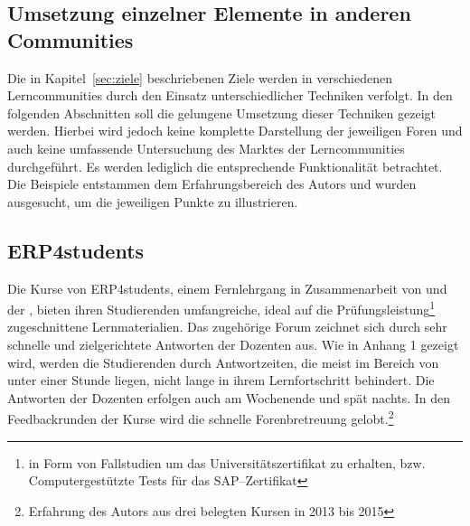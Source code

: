 \subsection{Umsetzung einzelner Elemente in anderen\\ Communities} %
\label{sub:umsetzung_einzelner_elemente_in_anderen_communities}
Die in Kapitel~\ref{sec:ziele} beschriebenen Ziele werden in verschiedenen Lerncommunities durch den Einsatz unterschiedlicher Techniken verfolgt. In den folgenden Abschnitten soll die gelungene Umsetzung dieser Techniken gezeigt werden. Hierbei wird jedoch keine komplette Darstellung der jeweiligen Foren und auch keine umfassende Untersuchung des Marktes der Lerncommunities durchgeführt. Es werden lediglich die entsprechende Funktionalität betrachtet. Die Beispiele entstammen dem Erfahrungsbereich des Autors und wurden ausgesucht, um die jeweiligen Punkte zu illustrieren.

\subsection{ERP4students} %
\label{sub:erp4students}

Die Kurse von ERP4students, einem Fernlehrgang in Zusammenarbeit von  und der , bieten ihren Studierenden umfangreiche, ideal auf die Prüfungsleistung\footnote{in Form von Fallstudien um das Universitätszertifikat zu erhalten, bzw. Computergestützte Tests für das SAP–Zertifikat} zugeschnittene Lernmaterialien. Das zugehörige Forum zeichnet sich durch sehr schnelle und zielgerichtete Antworten der Dozenten aus. Wie in Anhang 1 gezeigt wird, werden die Studierenden durch Antwortzeiten, die meist im Bereich von unter einer Stunde liegen, nicht lange in ihrem Lernfortschritt behindert. Die Antworten der Dozenten erfolgen auch am Wochenende und spät nachts. In den Feedbackrunden der Kurse wird die schnelle Forenbretreuung gelobt.\footnote{Erfahrung des Autors aus drei belegten Kursen in 2013 bis 2015}

